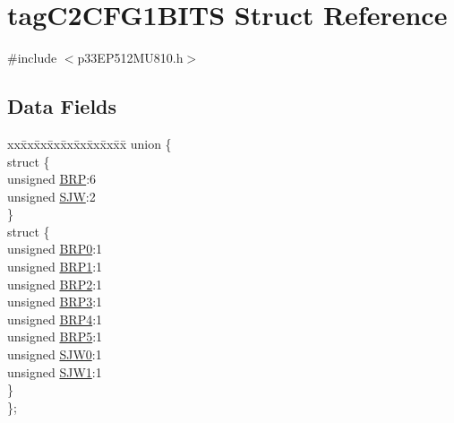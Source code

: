 \hypertarget{structtag_c2_c_f_g1_b_i_t_s}{}\section{tag\+C2\+C\+F\+G1\+B\+I\+TS Struct Reference}
\label{structtag_c2_c_f_g1_b_i_t_s}


{\ttfamily \#include $<$p33\+E\+P512\+M\+U810.\+h$>$}

\subsection*{Data Fields}
\begin{DoxyCompactItemize}
\item 
\begin{tabbing}
xx\=xx\=xx\=xx\=xx\=xx\=xx\=xx\=xx\=\kill
union \{\\
\>struct \{\\
\>\>unsigned \hyperlink{structtag_c2_c_f_g1_b_i_t_s_ae58f97af55d2926c7604071c03cce2ea}{BRP}:6\\
\>\>unsigned \hyperlink{structtag_c2_c_f_g1_b_i_t_s_a4b6f11475d67f4b0cf215740ab306f27}{SJW}:2\\
\>\} \\
\>struct \{\\
\>\>unsigned \hyperlink{structtag_c2_c_f_g1_b_i_t_s_a2dc1817d479cb567ab68ce63a6170412}{BRP0}:1\\
\>\>unsigned \hyperlink{structtag_c2_c_f_g1_b_i_t_s_a1d13a4c74d060baa6d652658b10155a8}{BRP1}:1\\
\>\>unsigned \hyperlink{structtag_c2_c_f_g1_b_i_t_s_a6ccc44a273a42657d5adb296952b3a8b}{BRP2}:1\\
\>\>unsigned \hyperlink{structtag_c2_c_f_g1_b_i_t_s_a84e071832be010fbf9ccbb2fe7ab4631}{BRP3}:1\\
\>\>unsigned \hyperlink{structtag_c2_c_f_g1_b_i_t_s_abb197803ec15b7aee5bb7b69bd5f0ba0}{BRP4}:1\\
\>\>unsigned \hyperlink{structtag_c2_c_f_g1_b_i_t_s_a25c0a19dc5bf39bfc514755041ea75af}{BRP5}:1\\
\>\>unsigned \hyperlink{structtag_c2_c_f_g1_b_i_t_s_aaaa0b320d074d30cd5474f898d0da8fd}{SJW0}:1\\
\>\>unsigned \hyperlink{structtag_c2_c_f_g1_b_i_t_s_abc759fdb4e9ca521d97602fb988fde8f}{SJW1}:1\\
\>\} \\
\}; \\

\end{tabbing}\end{DoxyCompactItemize}



